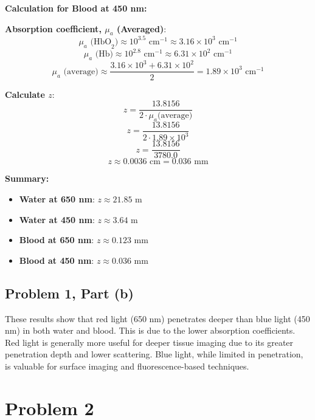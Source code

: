\documentclass[12pt]{article}
\begin{document}
\textbf{Calculation for Blood at 450 nm:}

\textbf{Absorption coefficient, \( \mu_a\) (Averaged)}:
\[ \mu_a \text{ (HbO}_2) \approx 10^3.5 \text{ cm}^{-1} \approx 3.16 \times 10^3 \text{ cm}^{-1} \]
\[ \mu_a \text{ (Hb)} \approx 10^2.8 \text{ cm}^{-1} \approx 6.31 \times 10^2 \text{ cm}^{-1} \]
\[ \mu_a \text{ (average)} \approx \frac{3.16 \times 10^3 + 6.31 \times 10^2}{2} = 1.89 \times 10^3 \text{ cm}^{-1} \]



\textbf{Calculate \( z \)}:
\[ z = \frac{13.8156}{2 \cdot \mu_a \text{(average)}} \]
\[ z = \frac{13.8156}{2 \cdot 1.89 \times 10^3} \]
\[ z = \frac{13.8156}{3780.0} \]
\[ z \approx 0.0036 \text{ cm} = 0.036 \text{ mm} \]

\textbf{Summary:}
\begin{itemize}
    \item \textbf{Water at 650 nm}: \( z \approx 21.85 \text{ m} \)
    \item \textbf{Water at 450 nm}: \( z \approx 3.64 \text{ m} \)
    \item \textbf{Blood at 650 nm}: \( z \approx 0.123 \text{ mm} \)
    \item \textbf{Blood at 450 nm}: \( z \approx 0.036 \text{ mm} \)
\end{itemize}

\subsection*{Problem 1, Part (b)}
These results show that red light (650 nm) penetrates deeper than blue light (450 nm) in both water and blood. This is due to the lower absorption coefficients. Red light is generally more useful for deeper tissue imaging due to its greater penetration depth and lower scattering. Blue light, while limited in penetration, is valuable for surface imaging and fluorescence-based techniques. 


\newpage
\section*{Problem 2}
\end{document}
